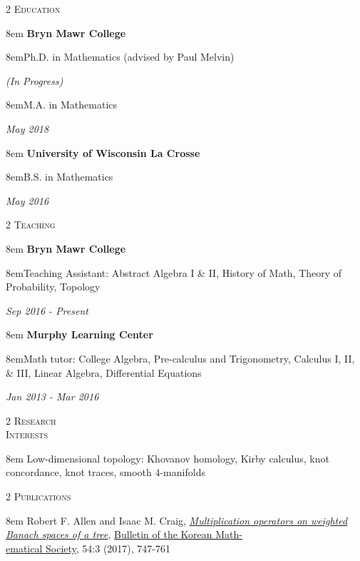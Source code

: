 \documentclass[11pt]{article}
\newcommand{\itemreg}[1]{\begin{addmargin}[0em]{8em} #1 \end{addmargin}}
\newcommand{\iteminddate}[2]{\begin{addmargin}[1.75em]{8em}#1\end{addmargin}\vspace{-1.15em}\hfill\textit{#2}\\}
\newcommand{\iteminddateext}[2]{\begin{addmargin}[1.75em]{8em}#1\end{addmargin}\vspace{-2.6em}\hfill\textit{#2}\\ \vspace{1.5em}}
\begin{document}
\null
\vskip27.5pt



\begin{multicols}{2}
	\textsc{Education} 
	
	\columnbreak
	
	\itemreg{\textbf{Bryn Mawr College}}
		\iteminddate{Ph.D. in Mathematics (advised by Paul Melvin)}{(In Progress)}
		\iteminddate{M.A. in Mathematics}{May 2018}
	\vspace{.35em}
	\itemreg{\textbf{University of Wisconsin La Crosse}}
		\iteminddate{B.S. in Mathematics}{May 2016}
\end{multicols}
\vspace{-.5em}



\begin{multicols}{2}
	\textsc{Teaching} 
	
	\columnbreak
	
	\itemreg{\textbf{Bryn Mawr College}}
		\iteminddateext{Teaching Assistant: Abstract Algebra I \& II, History of Math, Theory of Probability, Topology}{Sep 2016 - Present}
		\vspace{.35em}
	\itemreg{\textbf{Murphy Learning Center}}
		\iteminddateext{Math tutor: College Algebra, Pre-calculus and Trigonometry, Calculus I, II, \& III, Linear Algebra, Differential Equations}{Jan 2013 - Mar 2016}
\end{multicols}
\vspace{.5em}



\begin{multicols}{2}
	\textsc{Research \\ Interests}
	
	\columnbreak
	
	\itemreg{Low-dimensional topology: Khovanov homology, Kirby calculus, knot concordance, knot traces, smooth $4$-manifolds}
\end{multicols}
\vspace{-.5em}



\begin{multicols}{2}
	\textsc{Publications}
	
	\columnbreak
	
	\itemreg{Robert F. Allen and Isaac M. Craig, \textit{\href{https://imsundberg.github.io/files/mult_op.pdf}{Multiplication operators on weighted Banach spaces of a tree}}, \href{http://bkms.kms.or.kr/}{Bulletin of the Korean Math-\\ematical Society}, 54:3 (2017), 747-761}
\end{multicols}
\vspace{-.5em}
\end{document}
